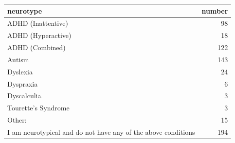 \begin{table}[ht]
\centering
\begin{tabular}{lr}
  \hline
neurotype & number \\ 
  \hline
ADHD (Inattentive) &  98 \\ 
  ADHD (Hyperactive) &  18 \\ 
  ADHD (Combined) & 122 \\ 
  Autism & 143 \\ 
  Dyslexia &  24 \\ 
  Dyspraxia &   6 \\ 
  Dyscalculia &   3 \\ 
  Tourette's Syndrome &   3 \\ 
  Other: &  15 \\ 
  I am neurotypical and do not have any of the above conditions & 194 \\ 
   \hline
\end{tabular}
\end{table}
